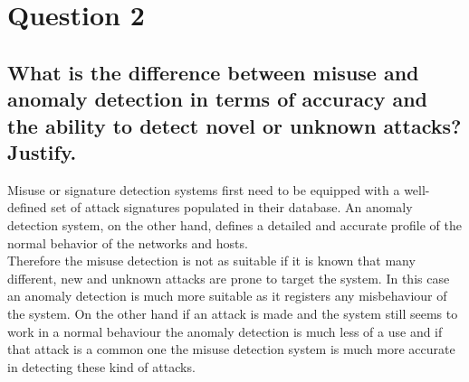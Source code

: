 \documentclass{report}
\begin{document}
	\section{Question 2}
	\startsection
		\renewcommand{\thesubsection}{\thesection.\Alph{subsection}}
		\subsection{What is the difference between misuse and anomaly detection in terms of accuracy and the ability to detect novel or unknown attacks? Justify.}
		\startsubsection
			Misuse or signature detection systems first need to be equipped with a well-defined set of attack signatures populated in their database. An anomaly detection system, on the other hand, defines a detailed and accurate profile of the normal behavior of the networks and hosts. \\
			Therefore the misuse detection is not as suitable if it is known that many different, new and unknown attacks are prone to target the system. In this case an anomaly detection is much more suitable as it registers any misbehaviour of the system. On the other hand if an attack is made and the system still seems to work in a normal behaviour the anomaly detection is much less of a use and if that attack is a common one the misuse detection system is much more accurate in detecting these kind of attacks.
		\closesection
	\closesection
\end{document}
